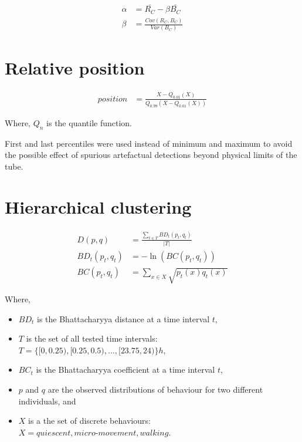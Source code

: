 \documentclass[a4paper,twoside,openright]{article}
\begin{document}
\begin{align}
\alpha &=  \bar{R_C} - \beta\bar{B_C} \\
\beta &= \frac{Cov(R_C, B_C)}{Var(B_C)}
\end{align}


\section*{Relative position}

\begin{align}
position &=  \frac{X - Q_{0.01}(X)}{Q_{0.99}(X - Q_{0.01}(X))}
\end{align}

Where, $Q_n$ is the quantile function.

First and last percentiles were used instead of minimum and maximum to avoid the possible effect of spurious artefactual detections beyond physical limits of the tube.



\section*{Hierarchical clustering}

\begin{align}
D(p,q) &=  \frac{\sum_{t \in T}{BD_t(p_t,q_t)}}{|T|} \\
BD_t(p_t,q_t) &= -\ln (BC(p_t,q_t))\\
BC(p_t,q_t) &= \sum_{x\in X} \sqrt{p_t(x) q_t(x)}
\end{align}


Where,
\begin{itemize}
\item $BD_t$ is the Bhattacharyya distance at a time interval $t$,
\item $T$ is the set of all tested time intervals: $T=\{[0, 0.25), [0.25,0.5), ..., [23.75, 24)\} h$,
\item $BC_t$ is the Bhattacharyya coefficient at a time interval $t$,
\item $p$ and $q$ are the observed distributions of behaviour for two different individuals, and
\item $X$ is a the set of discrete behaviours: $X = {quiescent, micro\text{-}movement, walking}$.
\end{itemize}
\end{document}
